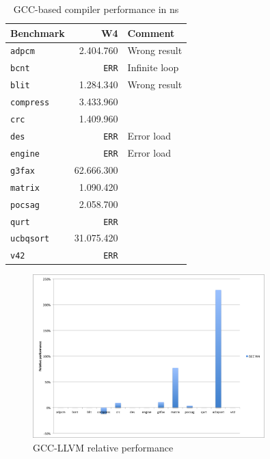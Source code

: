 \begin{table}
  \centering
    \begin{tabular}{|l|r|l|}
    \hline
    \textbf{Benchmark} & \multicolumn{1}{|r|}{\textbf{W4}} & \textbf{Comment} \\ \hline
	\texttt{adpcm} 		& 2.404.760 	&	Wrong result 	\\ \hline
	\texttt{bcnt} 		& \texttt{ERR}	&	Infinite loop	\\ \hline
	\texttt{blit} 		& 1.284.340 	&	Wrong result 	\\ \hline
	\texttt{compress} 	& 3.433.960 	&	\\ \hline
	\texttt{crc} 		& 1.409.960 	&	\\ \hline
	\texttt{des} 		& \texttt{ERR} 	&	Error load		\\ \hline
	\texttt{engine} 	& \texttt{ERR}	&	Error load		\\ \hline
	\texttt{g3fax} 		& 62.666.300 	&	\\ \hline
	\texttt{matrix} 	& 1.090.420 	&	\\ \hline
	\texttt{pocsag} 	& 2.058.700 	&	\\ \hline
	\texttt{qurt}	 	& \texttt{ERR} 	&	\\ \hline
	\texttt{ucbqsort} 	& 31.075.420 	&	\\ \hline
	\texttt{v42}	 	& \texttt{ERR} 	&	\\ \hline
    \end{tabular}
  \caption{GCC-based compiler performance in ns}
  \label{tbl:GCC_perf}
\end{table}


\begin{figure}[ht]
\centering
\includegraphics[width=0.8\textwidth]{5_results/img/rel_GCC.png}
\caption{GCC-LLVM relative performance}
\label{fig:rel_GCC}
\end{figure}

